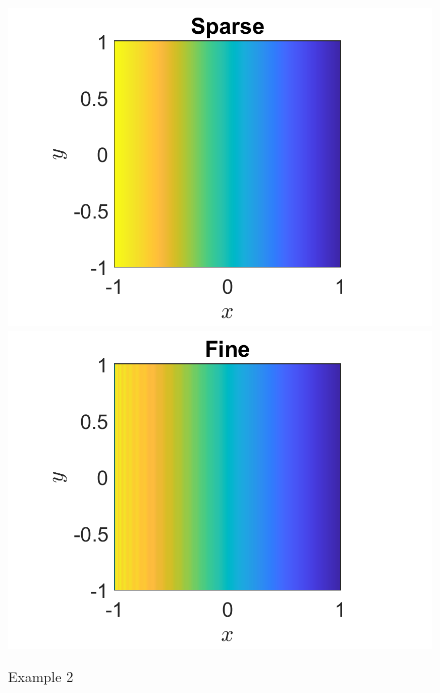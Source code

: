 \documentclass[11pt, a4paper]{article}
\theoremstyle{definition}
\begin{document}
\begin{figure}[h]
	\centering
	\includegraphics[scale=0.3]{Ex2a.png}
	\includegraphics[scale=0.3]{Ex2b.png}
	\caption{Example 2} 
	\label{F2}
\end{figure} 
\end{document}
